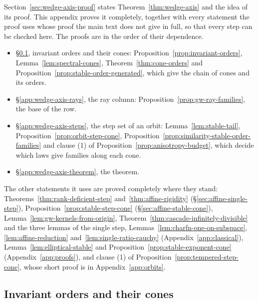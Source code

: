 Section~\ref{sec:wedge-axis-proof} states Theorem~\ref{thm:wedge-axis} and the idea of its proof. This
appendix proves it completely, together with every statement the proof uses whose proof the main text
does not give in full, so that every step can be checked here. The proofs are in the order of their dependence.
\begin{itemize}
\item \S\ref{app:wedge-axis-orders}, invariant orders and their cones:
Proposition~\ref{prop:invariant-orders}, Lemma~\ref{lem:spectral-cones}, Theorem~\ref{thm:cone-orders}
and Proposition~\ref{prop:stable-order-generated}, which give the chain of cones and its orders.
\item \S\ref{app:wedge-axis-rays}, the ray column: Proposition~\ref{prop:gw-ray-families}, the base of
the row.
\item \S\ref{app:wedge-axis-steps}, the step set of an orbit: Lemma~\ref{lem:stable-tail},
Proposition~\ref{prop:orbit-step-cone},
Proposition~\ref{prop:similarity-stable-order-families} and clause (1) of
Proposition~\ref{prop:anisotropy-budget}, which decide which laws give families along each cone.
\item \S\ref{app:wedge-axis-theorem}, the theorem.
\end{itemize}
The other statements it uses are proved completely where they stand:
Theorems~\ref{thm:rank-deficient-step} and~\ref{thm:affine-rigidity} (\S\ref{sec:affine-single-step}),
Proposition~\ref{prop:stable-step-cone} (\S\ref{sec:affine-stable-cone}),
Lemma~\ref{lem:gw-kernels-from-origin}, Theorem~\ref{thm:cascade-infinitely-divisible} and the three
lemmas of the single step, Lemmas~\ref{lem:charfn-one-on-subspace}, \ref{lem:affine-reduction}
and~\ref{lem:single-ratio-cauchy} (Appendix~\ref{app:classical}), Lemma~\ref{lem:elliptical-stable} and
Proposition~\ref{prop:stable-exponent-cone} (Appendix~\ref{app:proofs}), and clause (1) of
Proposition~\ref{prop:tempered-step-cone}, whose short proof is in Appendix~\ref{app:orbits}.

\subsection{Invariant orders and their cones}\label{app:wedge-axis-orders}

